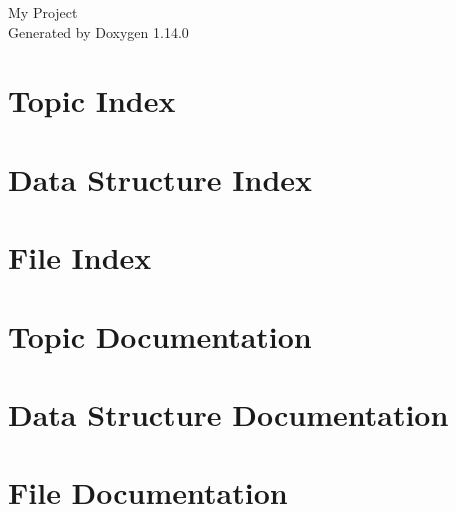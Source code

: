 \documentclass[twoside]{book}
\newcommand{\+}{\discretionary{\mbox{\scriptsize$\hookleftarrow$}}{}{}}
\newcommand{\clearemptydoublepage}{%
    \newpage{\pagestyle{empty}\cleardoublepage}%
  }
\begin{document}
  \raggedbottom
    \hypersetup{pageanchor=false,
                bookmarksnumbered=true,
                pdfencoding=unicode
               }
  \begin{titlepage}
  \vspace*{7cm}
  \begin{center}%
  {\Large My Project}\\
  \vspace*{1cm}
  {\large Generated by Doxygen 1.14.0}\\
  \end{center}
  \end{titlepage}
  \clearemptydoublepage
  \tableofcontents
  \clearemptydoublepage
  \hypersetup{pageanchor=true}
\chapter{Topic Index}

\chapter{Data Structure Index}

\chapter{File Index}

\chapter{Topic Documentation}


\chapter{Data Structure Documentation}





\chapter{File Documentation}






















  \backmatter
  \newpage
  \clearemptydoublepage
  \printindex
\end{document}
